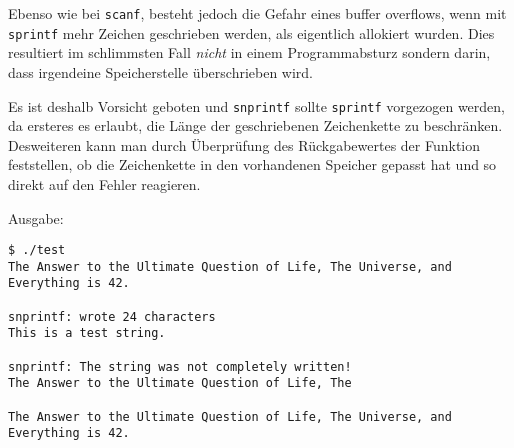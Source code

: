 Ebenso wie bei \texttt{scanf}, besteht jedoch die Gefahr eines buffer overflows, wenn mit \texttt{sprintf} mehr Zeichen geschrieben werden, als eigentlich allokiert wurden.
Dies resultiert im schlimmsten Fall \emph{nicht} in einem Programmabsturz sondern darin, dass irgendeine Speicherstelle überschrieben wird.

Es ist deshalb Vorsicht geboten und \texttt{snprintf} sollte \texttt{sprintf} vorgezogen werden, da ersteres es erlaubt, die L\"{a}nge der geschriebenen Zeichenkette zu beschr\"{a}nken.
Desweiteren kann man durch \"{U}berpr\"{u}fung des R\"{u}ckgabewertes der Funktion feststellen, ob die Zeichenkette in den vorhandenen Speicher gepasst hat und so direkt auf den Fehler reagieren.

\noindent Ausgabe:
\begin{verbatim}
$ ./test
The Answer to the Ultimate Question of Life, The Universe, and Everything is 42.

snprintf: wrote 24 characters
This is a test string.

snprintf: The string was not completely written!
The Answer to the Ultimate Question of Life, The

The Answer to the Ultimate Question of Life, The Universe, and Everything is 42.
\end{verbatim}



\endinput
